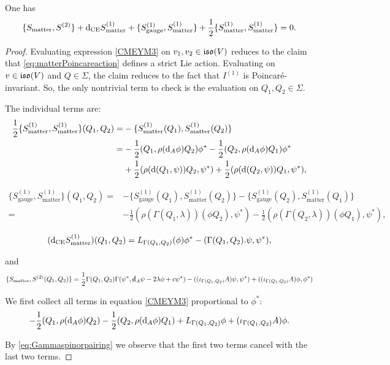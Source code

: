 \documentclass[10pt, oneside]{article}
\newcommand{\gauge}{\mathrm{gauge}}
\newcommand{\matter}{\mathrm{matter}}
\begin{document}
\begin{lemma} 
One has
\begin{equation}\label{CMEYM3}
\{S_{\matter}, S^{(2)}\} + \d_{\mr{CE}} S_{\matter}^{(1)} + \{S_{\gauge}^{(1)}, S_{\matter}^{(1)}\} + \frac{1}{2} \{S_{\matter}^{(1)}, S_{\matter}^{(1)}\} = 0 .
\end{equation}
\end{lemma}
\begin{proof}
Evaluating expression \eqref{CMEYM3} on $v_1,v_2 \in \mathfrak{iso}(V)$ reduces to the claim that \eqref{eq:matterPoincareaction} defines a strict Lie action. Evaluating on $v \in \mathfrak{iso}(V)$ and $Q \in \Sigma$, the claim reduces to the fact that $I^{(1)}$ is Poincar\'{e}-invariant. So, the only nontrivial term to check is the evaluation on $Q_1,Q_2 \in \Sigma$. 

The individual terms are:
\begin{align*}
\frac{1}{2}\{S_{\matter}^{(1)}, S_{\matter}^{(1)}\}(Q_1, Q_2) =& -\{S_{\matter}^{(1)}(Q_1), S_{\matter}^{(1)}(Q_2)\} \\
=&-\frac{1}{2}(Q_1, \rho(\d_A \phi) Q_2)\phi^* - \frac{1}{2}(Q_2, \rho(\d_A \phi)Q_1)\phi^* \\ &  +\frac{1}{2}(\rho(\d(Q_1,\psi))Q_2, \psi^*) +\frac{1}{2} (\rho(\d(Q_2, \psi)) Q_1, \psi^*),
\end{align*}

\begin{align*}
\{S_{\gauge}^{(1)}, S_{\matter}^{(1)}\}(Q_1, Q_2) = &-\{S_{\gauge}^{(1)}(Q_1), S_{\matter}^{(1)}(Q_2)\} - \{S_{\gauge}^{(1)}(Q_2), S_{\matter}^{(1)}(Q_1)\} \\
=& -\frac{1}{2}(\rho(\Gamma(Q_1, \lambda))(\phi Q_2), \psi^*) - \frac{1}{2}(\rho(\Gamma(Q_2, \lambda))(\phi Q_1), \psi^*),
\end{align*}

\[
(\d_{\mr{CE}}S_{\matter}^{(1)})(Q_1,Q_2) = L_{\Gamma(Q_1,Q_2)} (\phi)\phi^* - (\Gamma(Q_1,Q_2).\psi, \psi^*),
\]

and
\[
\{S_{\matter}, S^{(2)}(Q_1,Q_2)\} =  \frac{1}{2} \Gamma(Q_1,Q_2) \Gamma(\psi^*, \sd \d_A \psi - 2 \lambda\phi + c\psi^*) - ((\iota_{\Gamma(Q_1, Q_2)} A)\psi, \psi^*) + ((\iota_{\Gamma(Q_1, Q_2)} A)\phi, \phi^*)
\]

We first collect all terms in equation \eqref{CMEYM3} proportional to $\phi^*$:
\[
-\frac{1}{2} (Q_1, \rho({\rm d}_A\phi) Q_2) - \frac{1}{2} (Q_2, \rho({\rm d}_A \phi) Q_1) + L_{\Gamma(Q_1,Q_2)} \phi + (\iota_{\Gamma(Q_1, Q_2)} A)\phi.
\]

By \eqref{eq:Gammaspinorpairing} we observe that the first two terms cancel with the last two terms.


\end{proof}
\end{document}
